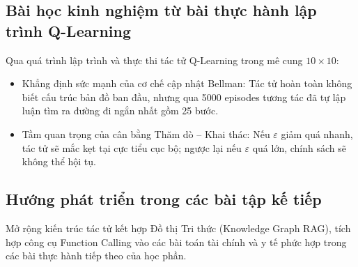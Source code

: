 \documentclass[12pt,a4paper]{article}
\begin{document}
\subsection{Bài học kinh nghiệm từ bài thực hành lập trình Q-Learning}
Qua quá trình lập trình và thực thi tác tử Q-Learning trong mê cung $10 \times 10$:
\begin{itemize}
    \item Khẳng định sức mạnh của cơ chế cập nhật Bellman: Tác tử hoàn toàn không biết cấu trúc bản đồ ban đầu, nhưng qua 5000 episodes tương tác đã tự lập luận tìm ra đường đi ngắn nhất gồm 25 bước.
    \item Tầm quan trọng của cân bằng Thăm dò -- Khai thác: Nếu $\varepsilon$ giảm quá nhanh, tác tử sẽ mắc kẹt tại cực tiểu cục bộ; ngược lại nếu $\varepsilon$ quá lớn, chính sách sẽ không thể hội tụ.
\end{itemize}

\subsection{Hướng phát triển trong các bài tập kế tiếp}
Mở rộng kiến trúc tác tử kết hợp Đồ thị Tri thức (Knowledge Graph RAG), tích hợp công cụ Function Calling vào các bài toán tài chính và y tế phức hợp trong các bài thực hành tiếp theo của học phần.
\end{document}
